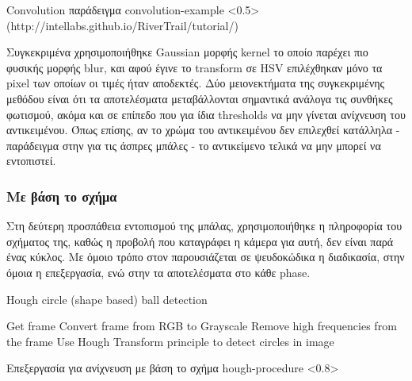 %
{Convolution παράδειγμα}%
{convolution-example}%
<0.5>%
(http://intellabs.github.io/RiverTrail/tutorial/)

Συγκεκριμένα χρησιμοποιήθηκε Gaussian μορφής kernel το οποίο παρέχει πιο φυσικής μορφής blur, και αφού έγινε το transform σε HSV επιλέχθηκαν μόνο τα pixel των οποίων οι τιμές ήταν αποδεκτές. Δύο μειονεκτήματα της συγκεκριμένης μεθόδου είναι ότι τα αποτελέσματα μεταβάλλονται σημαντικά ανάλογα τις συνθήκες φωτισμού, ακόμα και σε επίπεδο που για ίδια thresholds να μην γίνεται ανίχνευση του α\-ντι\-κει\-μέ\-νου. Όπως επίσης, αν το χρώμα του αντικειμένου δεν επιλεχθεί κατάλληλα - παράδειγμα στην  για τις άσπρες μπάλες - το αντικείμενο τελικά να μην μπορεί να εντοπιστεί. 


\subsubsection{Με βάση το σχήμα}

Στη δεύτερη προσπάθεια εντοπισμού της μπάλας, χρησιμοποιήθηκε η πληροφορία του σχήματος της, καθώς η προβολή που καταγράφει η κάμερα για αυτή, δεν είναι παρά ένας κύκλος. Με όμοιο τρόπο στον  παρουσιάζεται σε ψευδοκώδικα η διαδικασία, στην  όμοια η επεξεργασία, ενώ στην  τα αποτελέσματα στο κάθε phase.

\begin{algorithm}[H]
	\caption[Hough circle (shape based) ball detection]{Hough circle (shape based) ball detection}\label{alg:hough-detect}
	\begin{algorithmic}[1]
                \State Get frame
                \State Convert frame from RGB to Grayscale
                \State Remove high frequencies from the frame
                \State Use Hough Transform principle to detect circles in image 
            \EndFor
	\end{algorithmic}
\end{algorithm}

%
{Επεξεργασία για ανίχνευση με βάση το σχήμα}%
{hough-procedure}%
<0.8>

